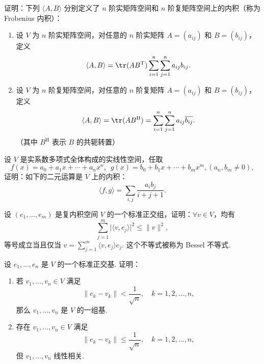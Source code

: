 \begin{exercise}

    \begin{exgroup}
        \item 证明：下列 $\langle A, B \rangle$ 分别定义了 $n$ 阶实矩阵空间和 $n$ 阶复矩阵空间上的内积（称为 Frobenius 内积）：
        \begin{enumerate}
            \item 设 $V$ 为 $n$ 阶实矩阵空间，对任意的 $n$ 阶实矩阵 $A = (a_{ij})$ 和 $B = (b_{ij})$，定义
                  \[
                      \langle A, B \rangle = \tr(A B^{\mathrm{T}}) \sum_{i = 1}^{n} \sum_{j = 1}^{n} a_{ij}b_{ij}.
                  \]
            \item 设 $V$ 为 $n$ 阶复矩阵空间，对任意的 $n$ 阶复矩阵 $A = (a_{ij})$ 和 $B = (b_{ij})$，定义
                  \[
                      \langle A, B \rangle = \tr(A B^{\mathrm{H}}) = \sum_{i = 1}^{n} \sum_{j = 1}^{n} a_{ij}\overline{b_{ij}}.
                  \]
                  （其中 $B^{\mathrm{H}}$ 表示 $B$ 的共轭转置）
        \end{enumerate}
        \item 设 $V$ 是实系数多项式全体构成的实线性空间，任取
        \[ f(x) = a_0 + a_1 x + \cdots + a_n x^n, \enspace g(x) = b_0 + b_1 x + \cdots + b_m x^m, (a_n, b_m \neq 0), \]
        证明：如下的二元运算是 $V$ 上的内积：
        \[ \langle f, g \rangle = \sum_{i, j} \dfrac{a_i b_j}{i + j + 1}. \]
    \end{exgroup}

    \begin{exgroup}
        \item 设 $ (e_1, \ldots , e_m) $ 是复内积空间 $ V $ 的一个标准正交组，证明：$ \forall v \in V $，均有
        \[ \sum_{j = 1}^{m} \lvert \langle v, e_j \rangle \rvert^2 \leqslant \lVert v \rVert^2, \]
        等号成立当且仅当 $ v = \displaystyle\sum_{j = 1}^{m} \langle v, e_j \rangle e_j $. 这个不等式被称为 Bessel 不等式.
        \item 设 $e_1, \ldots, e_n$ 是 $V$ 的一个标准正交基. 证明：
        \begin{enumerate}
            \item 若 $v_1, \ldots, v_n \in V$ 满足
                  \[
                      \lVert e_k - v_k \rVert < \dfrac{1}{\sqrt{n}}, \quad k = 1, 2, \ldots, n,
                  \]
                  那么 $v_1, \ldots, v_n$ 是 $V$ 的一组基.
            \item 存在 $v_1, \ldots, v_n \in V$ 满足
                  \[
                      \lVert e_k - v_k \rVert \leqslant \dfrac{1}{\sqrt{n}}, \quad k = 1, 2, \ldots, n,
                  \]
                  但 $v_1, \ldots, v_n$ 线性相关.
        \end{enumerate}
    \end{exgroup}


\end{exercise}
